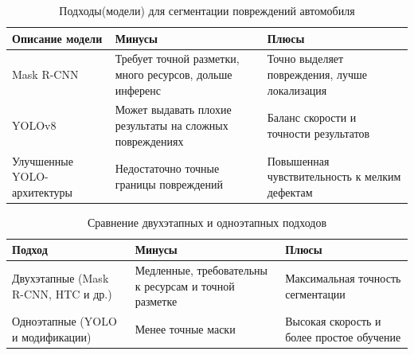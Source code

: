 \begin{table}[ht]
\caption{Подходы(модели) для сегментации повреждений автомобиля}
\label{table:simple_example}
\begin{tabularx}{\textwidth}{|>{\raggedright\arraybackslash}p{4.5cm}
                          |>{\raggedright\arraybackslash}X
                          |>{\raggedright\arraybackslash}X|}
\hline
\textbf{Описание модели} & \textbf{Минусы} & \textbf{Плюсы} \\
\hline
Mask R-CNN 
&
Требует точной разметки, много ресурсов, дольше инференс
&
Точно выделяет повреждения, лучше локализация
\\
\hline
YOLOv8
&
Может выдавать плохие результаты на сложных повреждениях
&
Баланс скорости и точности результатов
\\
\hline
Улучшенные YOLO-архитектуры
&
Недостаточно точные границы повреждений
&
Повышенная чувствительность к мелким дефектам
\\
\hline
\end{tabularx}
\end{table}

\begin{table}[ht]
\caption{Сравнение двухэтапных и одноэтапных подходов}
\label{table:simple_example}
\begin{tabularx}{\textwidth}{|>{\raggedright\arraybackslash}p{4.5cm}
                          |>{\raggedright\arraybackslash}X
                          |>{\raggedright\arraybackslash}X|}
\hline
\textbf{Подход} & \textbf{Минусы} & \textbf{Плюсы} \\
\hline
Двухэтапные (Mask R-CNN, HTC и др.)
&
Медленные, требовательны к ресурсам и точной разметке
&
Максимальная точность сегментации
\\
\hline
Одноэтапные (YOLO и модификации)
&
Менее точные маски
&
Высокая скорость и более простое обучение
\\
\hline
\end{tabularx}
\end{table}
